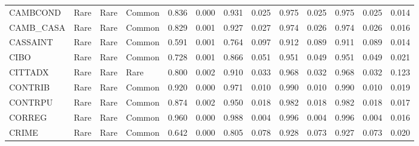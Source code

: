 \begin{tiny}
\begin{longtable}{|l|l|l|l|r|r|r|r|r|r|r|r|r|}
    CAMBCOND &            Rare &                         Rare &         Common &          0.836 &   0.000 &                    0.931 &                  0.025 &                  0.975 &                  0.025 &                  0.975 &                  0.025 &              0.014 \\
    CAMB\_CASA &            Rare &                         Rare &         Common &          0.829 &   0.001 &                    0.927 &                  0.027 &                  0.974 &                  0.026 &                  0.974 &                  0.026 &              0.016 \\
    CASSAINT &            Rare &                         Rare &         Common &          0.591 &   0.001 &                    0.764 &                  0.097 &                  0.912 &                  0.089 &                  0.911 &                  0.089 &              0.014 \\
    CIBO &            Rare &                         Rare &         Common &          0.728 &   0.001 &                    0.866 &                  0.051 &                  0.951 &                  0.049 &                  0.951 &                  0.049 &              0.021 \\
    \rowcolor{Kol2023}
    CITTADX &            Rare &                         Rare &           Rare &          0.800 &   0.002 &                    0.910 &                  0.033 &                  0.968 &                  0.032 &                  0.968 &                  0.032 &              0.123 \\
    CONTRIB &            Rare &                         Rare &         Common &          0.920 &   0.000 &                    0.971 &                  0.010 &                  0.990 &                  0.010 &                  0.990 &                  0.010 &              0.019 \\
    CONTRPU &            Rare &                         Rare &         Common &          0.874 &   0.002 &                    0.950 &                  0.018 &                  0.982 &                  0.018 &                  0.982 &                  0.018 &              0.017 \\
    CORREG &            Rare &                         Rare &         Common &          0.960 &   0.000 &                    0.988 &                  0.004 &                  0.996 &                  0.004 &                  0.996 &                  0.004 &              0.016 \\
    CRIME &            Rare &                         Rare &         Common &          0.642 &   0.000 &                    0.805 &                  0.078 &                  0.928 &                  0.073 &                  0.927 &                  0.073 &              0.020 \\

\end{longtable}
\end{tiny}
